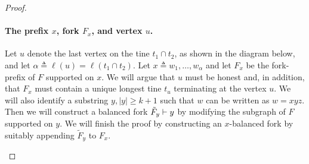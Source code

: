 \begin{proof}
  \paragraph{The prefix $x$, fork $F_x$, and vertex $u$.} 
  Let $u$ denote the last vertex on the tine
  $t_1 \cap t_2$, as shown in the diagram below, and let
  $\alpha \triangleq \ell(u) = \ell(t_1 \cap t_2)$. 
  Let $x \triangleq w_1, \ldots, w_\alpha$ 
  and let $F_x$ be the fork-prefix of $F$ supported on $x$. 
  We will argue that $u$ must be honest and, in addition, that 
  $F_x$ must contain a unique longest tine $t_u$ terminating 
  at the vertex $u$. 
  We will also identify a substring $y, |y| \geq k + 1$ 
  such that $w$ can be written as $w = xyz$. 
  Then we will construct a balanced fork $\tilde{F}_y \vdash y$ by 
  modifying the subgraph of $F$ supported on $y$. 
  We will finish the proof by constructing an $x$-balanced fork by 
  suitably appending $\tilde{F}_y$ to $F_x$.
    
  \begin{center}
    \end{center}


\end{proof}
